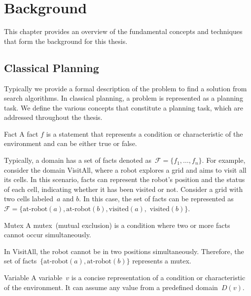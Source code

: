 \chapter{Background}
\label{sec:background}

This chapter provides an overview of the fundamental concepts and techniques that form the background for this thesis.

\section{Classical Planning}
\label{sec:classical-planning}

Typically we provide a formal description of the problem to find a solution from search algorithms. In classical planning, a problem is represented as a planning task. We define the various concepts that constitute a planning task, which are addressed throughout the thesis.

\begin{definition}{Fact}
    \label{def:fact}
    A fact $f$ is a statement that represents a condition or characteristic of the environment and can be either true or false.
\end{definition}

Typically, a domain has a set of facts denoted as~$\mathcal{F} = \{f_1, \ldots, f_n\}$. For example, consider the domain VisitAll, where a robot explores a grid and aims to visit all its cells. In this scenario, facts can represent the robot's position and the status of each cell, indicating whether it has been visited or not. Consider a grid with two cells labeled~$a$ and $b$. In this case, the set of facts can be represented as~$\mathcal{F} = \{\text{at-robot}(a),\text{at-robot}(b),\text{visited}(a),$ $\text{visited}(b)\}$.

\begin{definition}{Mutex}
    \label{def:mutex}
    A mutex~(mutual exclusion) is a condition where two or more facts cannot occur simultaneously.
\end{definition}

In VisitAll, the robot cannot be in two positions simultaneously. Therefore, the set of facts~$\{\text{at-robot}(a),\text{at-robot}(b)\}$ represents a mutex.

\begin{definition}{Variable}
    \label{def:variable}
    A variable~$v$ is a concise representation of a condition or characteristic of the environment. It can assume any value from a predefined domain~$D(v)$.
\end{definition}

